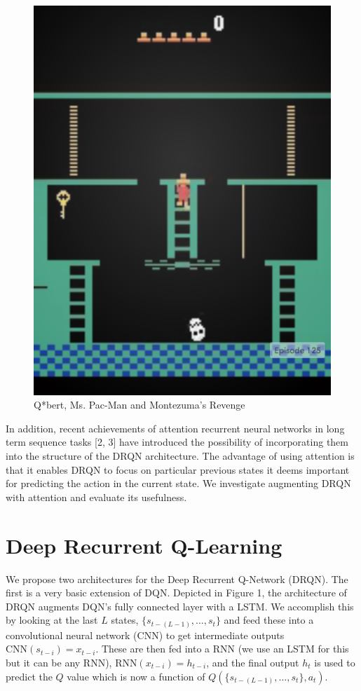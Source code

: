 \documentclass{article}
\begin{document}
\begin{figure}[h]
\begin{minipage}{0.8\textwidth}
            \centering
            \includegraphics[scale=0.15]{MontezumaRevenge}
        \end{minipage}
        \caption{Q*bert, Ms. Pac-Man and Montezuma's Revenge}
    \end{figure}

    In addition, recent achievements of attention recurrent neural networks in
    long term sequence tasks [2, 3] have introduced the possibility of incorporating
    them into the structure of the DRQN architecture.  The advantage of using
    attention is that it enables DRQN to focus on particular previous states it
    deems important for predicting the action in the current state. We investigate
    augmenting DRQN with attention and evaluate its usefulness. \\


\section{Deep Recurrent Q-Learning}
We propose two architectures for the Deep Recurrent Q-Network (DRQN). The first
is a very basic extension of DQN. Depicted in Figure 1, the architecture of DRQN
augments DQN's fully connected layer with a LSTM. We accomplish this by looking
at the last $L$ states, $\{s_{t-(L-1)}, \dots, s_{t}\}$ and feed these into a
convolutional neural network (CNN) to get intermediate outputs
$\text{CNN}(s_{t-i}) = x_{t-i}$. These are then fed into a RNN (we use an LSTM
for this but it can be any RNN), $\text{RNN}(x_{t-i}) = h_{t-i}$, and the final
output $h_t$ is used to predict the $Q$ value which is now a function of
$Q(\{s_{t-(L-1)}, \dots, s_t\}, a_t)$.
\end{document}
